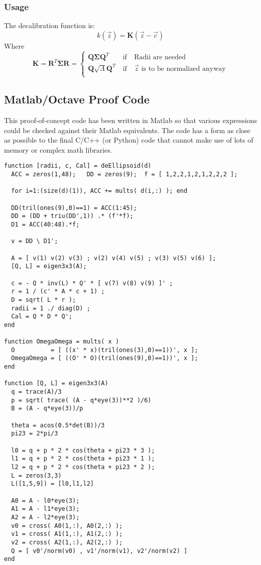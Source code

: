 \documentclass{article}
\def\mat#1{\mathbf{#1}}
\begin{document}
\subsubsection{Usage}
The decalibration function is:
\begin{equation}
k(\vec{z}) = \mat{K}\left( \vec{z} - \vec{c} \right)
\end{equation}
Where
\begin{equation}
\mat{K} 
= \mat{R}^T \mat{\Sigma} \mat{R}
= \left\{\begin{matrix}
\mat{Q} \mat{\Sigma} \mat{Q}^T &~\text{if}~&\text{Radii are needed} \\
\mat{Q} \sqrt{\Lambda} \mat{Q}^T &~\text{if}~&\vec{z}\text{ is to be normalized anyway}\\
\end{matrix}
\right.
\end{equation}
\subsection{Matlab/Octave Proof Code}
This proof-of-concept code has been written in Matlab so that various
expressions could be checked against their Matlab equivalents. The
code has a form as close as possible to the final C/C++ (or Python)
code that cannot make use of lots of memory or complex math
libraries.
\begin{verbatim}
function [radii, c, Cal] = deEllipsoid(d)
  ACC = zeros(1,48);   DD = zeros(9);  f = [ 1,2,2,1,2,1,2,2,2 ];

  for i=1:(size(d)(1)), ACC += mults( d(i,:) ); end

  DD(tril(ones(9),0)==1) = ACC(1:45);
  DD = (DD + triu(DD',1)) .* (f'*f);
  D1 = ACC(40:48).*f;

  v = DD \ D1';

  A = [ v(1) v(2) v(3) ; v(2) v(4) v(5) ; v(3) v(5) v(6) ];
  [Q, L] = eigen3x3(A);

  c = - Q * inv(L) * Q' * [ v(7) v(8) v(9) ]' ;
  r = 1 / (c' * A * c + 1) ;
  D = sqrt( L * r );
  radii = 1 ./ diag(D) ;
  Cal = Q * D * Q';
end

function OmegaOmega = mults( x )
  O          = [ ((x' * x)(tril(ones(3),0)==1))', x ];
  OmegaOmega = [ ((O' * O)(tril(ones(9),0)==1))', x ];
end

function [Q, L] = eigen3x3(A)
  q = trace(A)/3
  p = sqrt( trace( (A - q*eye(3))**2 )/6)
  B = (A - q*eye(3))/p

  theta = acos(0.5*det(B))/3
  pi23 = 2*pi/3

  l0 = q + p * 2 * cos(theta + pi23 * 3 );
  l1 = q + p * 2 * cos(theta + pi23 * 1 );
  l2 = q + p * 2 * cos(theta + pi23 * 2 );
  L = zeros(3,3)
  L([1,5,9]) = [l0,l1,l2]

  A0 = A - l0*eye(3);
  A1 = A - l1*eye(3);
  A2 = A - l2*eye(3);
  v0 = cross( A0(1,:), A0(2,:) );
  v1 = cross( A1(1,:), A1(2,:) );
  v2 = cross( A2(1,:), A2(2,:) );
  Q = [ v0'/norm(v0) , v1'/norm(v1), v2'/norm(v2) ]
end 
\end{verbatim}
\end{document}
